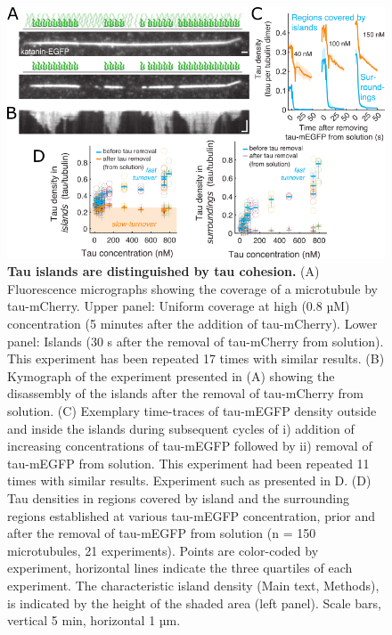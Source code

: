 \begin{figure}[h!]
\centering
\includegraphics[width=1\linewidth]{Figures/tau5.png}
\caption[Tau islands are distinguished by tau cohesion.]{
\textbf{Tau islands are distinguished by tau cohesion.} (A) Fluorescence micrographs showing the coverage of a microtubule by tau-mCherry. Upper panel: Uniform coverage at high (0.8 µM) concentration (5 minutes after the addition of tau-mCherry). Lower panel: Islands (30 s after the removal of tau-mCherry from solution). This experiment has been repeated 17 times with similar results. (B) Kymograph of the experiment presented in (A) showing the disassembly of the islands after the removal of tau-mCherry from solution. (C) Exemplary time-traces of tau-mEGFP density outside and inside the islands during subsequent cycles of i) addition of increasing concentrations of tau-mEGFP followed by ii) removal of tau-mEGFP from solution. This experiment had been repeated 11 times with similar results. Experiment such as presented in D. (D) Tau densities in regions covered by island and the surrounding regions established at various tau-mEGFP concentration, prior and after the removal of tau-mEGFP from solution (n = 150 microtubules, 21 experiments). Points are color-coded by experiment, horizontal lines indicate the three quartiles of each experiment. The characteristic island density (Main text, Methods), is indicated by the height of the shaded area (left panel). Scale bars, vertical 5 min, horizontal 1 µm.
	}\label{tau5}
\end{figure}
